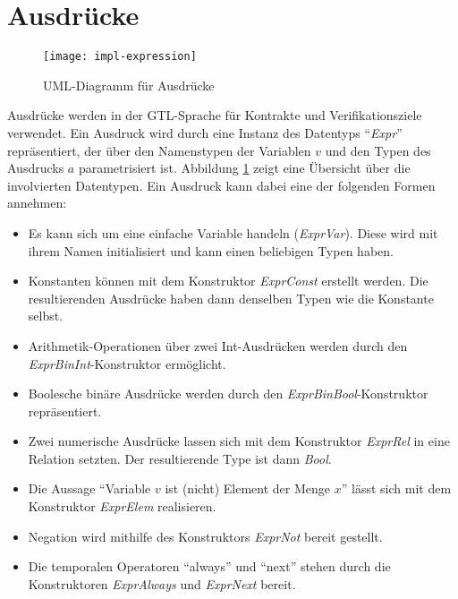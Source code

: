 \section{Ausdrücke}
\begin{figure}
  \centering
  \texttt{[image: impl-expression]}
  \caption{UML-Diagramm für Ausdrücke}
  \label{fig:uml-expr}
\end{figure}
Ausdrücke werden in der GTL-Sprache für Kontrakte und Verifikationsziele verwendet.
Ein Ausdruck wird durch eine Instanz des Datentyps "`\emph{Expr}"' repräsentiert, der über den Namenstypen der Variablen $v$ und den Typen des Ausdrucks $a$ parametrisiert ist.
Abbildung \ref{fig:uml-expr} zeigt eine Übersicht über die involvierten Datentypen.
Ein Ausdruck kann dabei eine der folgenden Formen annehmen:
\begin{itemize}
\item Es kann sich um eine einfache Variable handeln (\emph{ExprVar}).
  Diese wird mit ihrem Namen initialisiert und kann einen beliebigen Typen haben.
\item Konstanten können mit dem Konstruktor \emph{ExprConst} erstellt werden.
  Die resultierenden Ausdrücke haben dann denselben Typen wie die Konstante selbst.
\item Arithmetik-Operationen über zwei Int-Ausdrücken werden durch den \emph{ExprBinInt}-Konstruktor ermöglicht.
\item Boolesche binäre Ausdrücke werden durch den \emph{ExprBinBool}-Konstruktor repräsentiert.
\item Zwei numerische Ausdrücke lassen sich mit dem Konstruktor \emph{ExprRel} in eine Relation setzten.
  Der resultierende Type ist dann \emph{Bool}.
\item Die Aussage "`Variable $v$ ist (nicht) Element der Menge $x$"' lässt sich mit dem Konstruktor \emph{ExprElem} realisieren.
\item Negation wird mithilfe des Konstruktors \emph{ExprNot} bereit gestellt.
\item Die temporalen Operatoren "`always"' und "`next"' stehen durch die Konstruktoren \emph{ExprAlways} und \emph{ExprNext} bereit.
\end{itemize}
